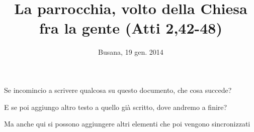 \documentclass[a4paper,12pt,article,oneside]{memoir} %
\title{La parrocchia, volto della Chiesa fra la gente (Atti 2,42-48)}
\author{}
\date{Busana, 19 gen. 2014}
\begin{document}
\maketitle
\thispagestyle{empty}

Se incomincio a scrivere qualcosa su questo documento, che cosa succede?

E se poi aggiungo altro testo a quello già scritto, dove andremo a finire?

Ma anche qui si possono aggiungere altri elementi che poi vengono sincronizzati
\end{document}
